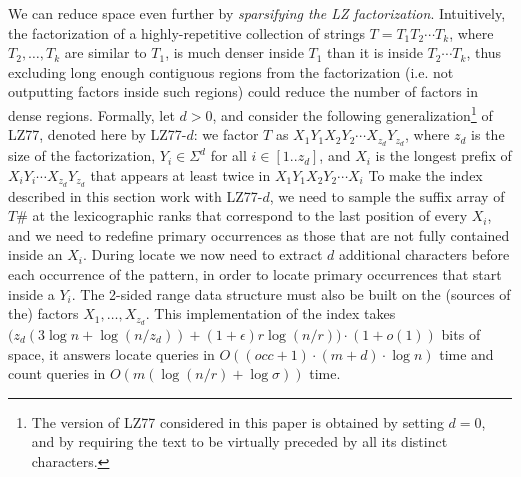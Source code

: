 \documentclass[a4paper,UKenglish]{lipics-v2016}
\newcommand{\runs}{r}
\begin{document}
We can reduce space even further by \emph{sparsifying the LZ factorization}. 
Intuitively, the factorization of a highly-repetitive collection of strings $T=T_1 T_2 \cdots T_k$, where $T_2,\dots,T_k$ are similar to $T_1$, is much denser inside $T_1$ than it is inside $T_2 \cdots T_k$, thus excluding long enough contiguous regions from the factorization (i.e. not outputting factors inside such regions) could reduce the number of factors in dense regions. Formally, let $d>0$, and consider the following generalization\footnote{The version of LZ77 considered in this paper is obtained by setting $d=0$, and by requiring the text to be virtually preceded by all its distinct characters.} of LZ77, denoted here by LZ77-$d$: we factor $T$ as $X_1Y_1X_2Y_2 \cdots X_{z_d}Y_{z_d}$, where $z_d$ is the size of the factorization, $Y_i \in \Sigma^d$ for all $i \in [1..z_d]$, and $X_i$ is the longest prefix of $X_iY_i \cdots X_{z_d}Y_{z_d}$ that appears at least twice in $X_1Y_1X_2Y_2 \cdots X_i$ To make the index described in this section work with LZ77-$d$, we need to sample the suffix array of $T\#$ at the lexicographic ranks that correspond to the last position of every $X_i$, and we need to redefine primary occurrences as those that are not fully contained inside an $X_i$. During locate we now need to extract $d$ additional characters before each occurrence of the pattern, in order to locate primary occurrences that start inside a $Y_i$. The 2-sided range data structure must also be built on the (sources of the) factors $X_1,\dots,X_{z_d}$. This implementation of the index takes $\big(z_d(3\log n + \log (n/z_d)) +(1+\epsilon)\runs\log(n/\runs) \big)\cdot(1+o(1))$ bits of space, it answers locate queries in $O((occ+1) \cdot (m+d) \cdot \log{n})$ time and count queries in $O(m(\log(n/\runs)+\log{\sigma}))$ time.
\end{document}

